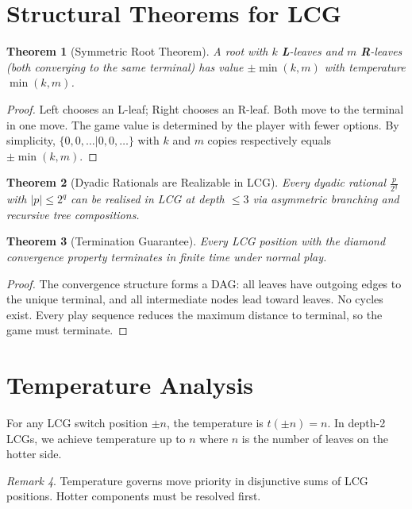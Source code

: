 \documentclass[10pt,a4paper,twocolumn]{article}
\newcommand{\Lopt}[1]{{\color{lblue}\textbf{#1}}}
\newcommand{\Ropt}[1]{{\color{rred}\textbf{#1}}}
\newcommand{\tmp}[1]{t\!\left(#1\right)}
\theoremstyle{plain}
\newtheorem{theorem}{Theorem}[section]
\theoremstyle{definition}
\theoremstyle{remark}
\newtheorem{remark}[theorem]{Remark}
\begin{document}
\section{Structural Theorems for LCG}

\begin{theorem}[Symmetric Root Theorem]
A root with $k$ \Lopt{L}-leaves and $m$ \Ropt{R}-leaves (both converging to the same terminal) has value $\pm\min(k,m)$ with temperature $\min(k,m)$.
\end{theorem}

\begin{proof}
Left chooses an L-leaf; Right chooses an R-leaf. Both move to the terminal in one move. The game value is determined by the player with fewer options. By simplicity, $\{0, 0, \ldots | 0, 0, \ldots\}$ with $k$ and $m$ copies respectively equals $\pm\min(k,m)$.
\end{proof}

\begin{theorem}[Dyadic Rationals are Realizable in LCG]
Every dyadic rational $\frac{p}{2^q}$ with $|p| \le 2^q$ can be realised in LCG at depth $\le 3$ via asymmetric branching and recursive tree compositions.
\end{theorem}

\begin{theorem}[Termination Guarantee]
Every LCG position with the diamond convergence property terminates in finite time under normal play.
\end{theorem}

\begin{proof}
The convergence structure forms a DAG: all leaves have outgoing edges to the unique terminal, and all intermediate nodes lead toward leaves. No cycles exist. Every play sequence reduces the maximum distance to terminal, so the game must terminate.
\end{proof}

\section{Temperature Analysis}

For any LCG switch position $\pm n$, the temperature is $\tmp{\pm n} = n$. In depth-2 LCGs, we achieve temperature up to $n$ where $n$ is the number of leaves on the hotter side.

\begin{remark}
Temperature governs move priority in disjunctive sums of LCG positions. Hotter components must be resolved first.
\end{remark}
\end{document}
